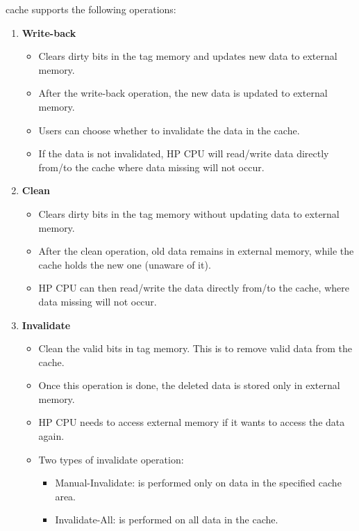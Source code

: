 \documentclass[main\_\_EN.tex]{subfiles}
\begin{document}
\chipname{} cache supports the following operations:

\begin{enumerate}
\item \textbf{Write-back}
\begin{itemize}
    \item Clears dirty bits in the tag memory and updates new data to external memory.
    \item After the write-back operation, the new data is updated to external memory.
    \item Users can choose whether to invalidate the data in the cache.
    \item If the data is not invalidated, HP CPU will read/write data directly from/to the cache where data missing will not occur.
\end{itemize}

\item \textbf{Clean}
\begin{itemize}
    \item Clears dirty bits in the tag memory without updating data to external memory.
    \item After the clean operation, old data remains in external memory, while the cache holds the new one (unaware of it).
    \item HP CPU can then read/write the data directly from/to the cache, where data missing will not occur.
\end{itemize}

\item \textbf{Invalidate}
\begin{itemize}
    \item Clean the valid bits in tag memory. This is to remove valid data from the cache.
    \item Once this operation is done, the deleted data is stored only in external memory.
    \item HP CPU needs to access external memory if it wants to access the data again.
    \item Two types of invalidate operation:
    \begin{itemize}
    \item Manual-Invalidate: is performed only on data in the specified cache area.
    \item Invalidate-All: is performed on all data in the cache.
    \end{itemize}
\end{itemize}


\end{enumerate}
\end{document}
